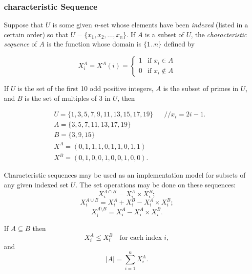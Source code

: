 \documentclass[
	12pt, %
	fleqn, %
	a4paper, %
]{LegrandOrangeBook}
\begin{document}
\subsubsection{characteristic Sequence}
\begin{definition}
    Suppose that \( U \) is some given \( n \)-set whose elements have been \textit{indexed} (listed in a certain order) so that \( U = \{x_1, x_2, \ldots, x_n\} \). If \( A \) is a subset of \( U \), the \textit{characteristic sequence} of \( A \) is the function whose domain is \( \{1..n\} \) defined by

\[
X^A_i = X^A(i) = 
\begin{cases} 
1 & \text{if } x_i \in A \\
0 & \text{if } x_i \notin A 
\end{cases}
\]
\end{definition}

\begin{example}
    If \( U \) is the set of the first 10 odd positive integers, \( A \) is the subset of primes in \( U \), and \( B \) is the set of multiples of 3 in \( U \), then
    
    \[
    \begin{aligned}
    &U = \{1, 3, 5, 7, 9, 11, 13, 15, 17, 19\} &&// x_i = 2i - 1. \\
    &A = \{3, 5, 7, 11, 13, 17, 19\} \\
    &B = \{3, 9, 15\} \\
    &X^A = (0, 1, 1, 1, 0, 1, 1, 0, 1, 1) \\
    &X^B = (0, 1, 0, 0, 1, 0, 0, 1, 0, 0).
    \end{aligned}
    \]
    \end{example}

    Characteristic sequences may be used as an implementation model for subsets of any given indexed set \( U \). The set operations may be done on these sequences:
    \[
    X^{A \cap B}_i = X^A_i \times X^B_i;
    \]
    \[
    X^{A \cup B}_i = X^A_i + X^B_i - X^A_i \times X^B_i;
    \]
    \[
    X^{A \setminus B}_i = X^A_i - X^A_i \times X^B_i.
    \]
    
    If \( A \subseteq B \) then
    \[
    X^A_i \leq X^B_i \quad \text{for each index } i,
    \]
    and
    \[
    |A| = \sum_{i=1}^{n} X^A_i.
    \]

\end{document}
